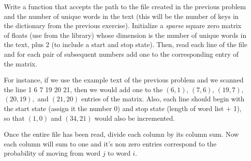 \begin{problem}
Write a function that accepts the path to the file created in the previous problem and the number of unique words in the text (this will be the number of keys in the dictionary from the previous exercise). %
Initialize a \emph{sparse} square zero matrix of floats (use  from the  library) whose dimension is the number of unique words in the text, plus 2 (to include a start and stop state).
Then, read each line of the file and for each pair of subsequent numbers add one to the corresponding entry of the matrix.

For instance, if we use the example text of the previous problem and we scanned the line 1 6 7 19 20 21, then we would add one to the $(6,1)$, $(7,6)$, $(19,7)$, $(20,19),$ and $(21,20)$ entries of the matrix.
Also, each line should begin with the start state (assign it the number 0) and stop state (length of word list + 1), so that $(1,0)$ and $(34,21)$ would also be incremented.

Once the entire file has been read, divide each column by its column sum.
Now each column will sum to one and it's non zero entries correspond to the probability of moving from word $j$ to word $i$.
\end{problem}

\begin{comment}
\subsection*{Starting and Stopping states}

In the previous weather model we chose a fixed number of states to simulate.
However, in English, sentences are of varying length.
One way to simulate this is to create a start state and an end state.
To generate a new sentence, we begin in the given start state.
Subsequent words will have a probability of moving to the end state.
Once the chain has moved to the end state, we have reached the end of the sentence and place a period.
This is modeled in Python with a \li{while} loop and putting the start and stop state as the first and last column of the transition matrix, respectively.
In the following code, we use a multinomial distribution to produce the transitions.

# THIS NEEDS TO BE EXPLAINED IN THE SIMULATING TRANSITIONS SECTION.
# It's explanation is beyond their ken (as in, they don't know what a multinomial distribution
# is.  However, it is the best way I can think of to produce the transitions.
# Maybe put it in a function and give it to them as a black box to be understood later.
\end{comment}

